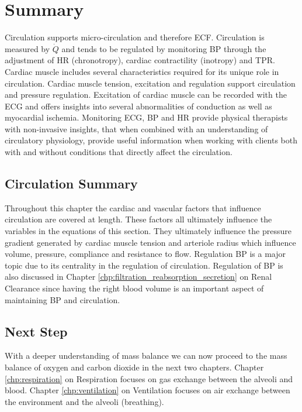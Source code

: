 \section{Summary}

Circulation supports micro-circulation and therefore ECF. Circulation is measured by $\dot{Q}$ and tends to be regulated by monitoring BP through the adjustment of HR (chronotropy), cardiac contractility (inotropy) and TPR. Cardiac muscle includes several characteristics required for its unique role in circulation. Cardiac muscle tension, excitation and regulation support circulation and pressure regulation. Excitation of cardiac muscle can be recorded with the ECG and offers insights into several abnormalities of conduction as well as myocardial ischemia. Monitoring ECG, BP and HR provide physical therapists with non-invasive insights, that when combined with an understanding of circulatory physiology, provide useful information when working with clients both with and without conditions that directly affect the circulation.

\subsection{Circulation Summary}

Throughout this chapter the cardiac and vascular factors that influence circulation are covered at length. These factors all ultimately influence the variables in the equations of this section. They ultimately influence the pressure gradient generated by cardiac muscle tension and arteriole radius which influence volume, pressure, compliance and resistance to flow. Regulation BP is a major topic due to its centrality in the regulation of circulation. Regulation of BP is also discussed in Chapter \ref{chp:filtration_reabsorption_secretion} on Renal Clearance since having the right blood volume is an important aspect of maintaining BP and circulation.

\subsection{Next Step}

With a deeper understanding of mass balance we can now proceed to the mass balance of oxygen and carbon dioxide in the next two chapters. Chapter \ref{chp:respiration} on Respiration focuses on gas exchange between the alveoli and blood. Chapter \ref{chp:ventilation} on Ventilation focuses on air exchange between the environment and the alveoli (breathing).

\printbibliography[heading=subbibintoc]